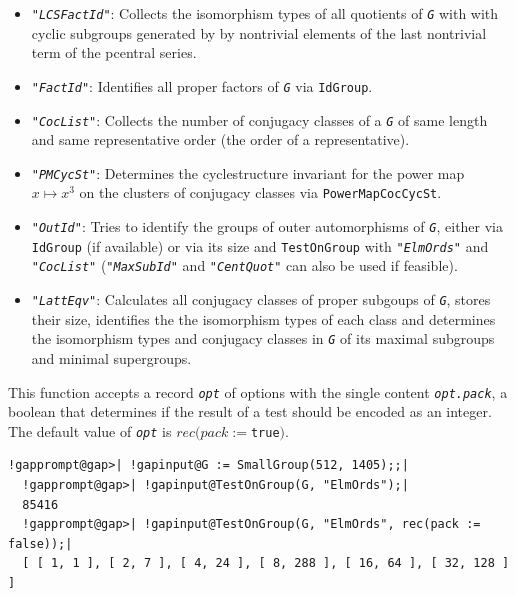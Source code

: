 \documentclass[a4paper,11pt]{report}
\begin{document}
{{{\begin{itemize}
\item  \mbox{\texttt{\mdseries\slshape "LCSFactId"}}: Collects the isomorphism types of all quotients of \mbox{\texttt{\mdseries\slshape G}} with with cyclic subgroups generated by by non\texttt{}trivial
elements of the last non\texttt{}trivial term of the
p\texttt{}central series. 
\item  \mbox{\texttt{\mdseries\slshape "FactId"}}: Identifies all proper factors of \mbox{\texttt{\mdseries\slshape G}} via \texttt{IdGroup}. 
\item  \mbox{\texttt{\mdseries\slshape "CocList"}}: Collects the number of conjugacy classes of a \mbox{\texttt{\mdseries\slshape G}} of same length and same representative order (the order of a representative). 
\item  \mbox{\texttt{\mdseries\slshape "PMCycSt"}}: Determines the cycle\texttt{}structure invariant for the power
map $x\mapsto x^3$ on the clusters of conjugacy classes via \texttt{PowerMapCocCycSt}. 
\item  \mbox{\texttt{\mdseries\slshape "OutId"}}: Tries to identify the groups of outer automorphisms of \mbox{\texttt{\mdseries\slshape G}}, either via \texttt{IdGroup} (if available) or via its size and \texttt{TestOnGroup} with \mbox{\texttt{\mdseries\slshape "ElmOrds"}} and \mbox{\texttt{\mdseries\slshape "CocList"}} (\mbox{\texttt{\mdseries\slshape "MaxSubId"}} and \mbox{\texttt{\mdseries\slshape "CentQuot"}} can also be used if feasible). 
\item  \mbox{\texttt{\mdseries\slshape "LattEqv"}}: Calculates all conjugacy classes of proper subgoups of \mbox{\texttt{\mdseries\slshape G}}, stores their size, identifies the the isomorphism types of each class and
determines the isomorphism types and conjugacy classes in \mbox{\texttt{\mdseries\slshape G}} of its maximal subgroups and minimal supergroups. 
\end{itemize}
 This function accepts a record \mbox{\texttt{\mdseries\slshape opt}} of options with the single content \mbox{\texttt{\mdseries\slshape opt.pack}}, a boolean that determines if the result of a test should be encoded as an
integer. The default value of \mbox{\texttt{\mdseries\slshape opt}} is $rec(pack:=$\texttt{true}$)$. 
\begin{Verbatim}[commandchars=!@|,fontsize=\small,frame=single,label=Example]
  !gapprompt@gap>| !gapinput@G := SmallGroup(512, 1405);;|
  !gapprompt@gap>| !gapinput@TestOnGroup(G, "ElmOrds");|
  85416
  !gapprompt@gap>| !gapinput@TestOnGroup(G, "ElmOrds", rec(pack := false));|
  [ [ 1, 1 ], [ 2, 7 ], [ 4, 24 ], [ 8, 288 ], [ 16, 64 ], [ 32, 128 ] ]
\end{Verbatim}
 }

}}
\end{document}
